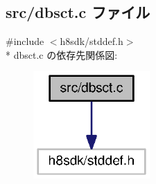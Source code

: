 \subsection{src/dbsct.c ファイル}
\label{dbsct_8c}
{\ttfamily \#include $<$h8sdk/stddef.\+h$>$}\\*
dbsct.\+c の依存先関係図\+:
\nopagebreak
\begin{figure}[H]
\begin{center}
\leavevmode
\includegraphics[width=126pt]{df/df0/dbsct_8c__incl}
\end{center}
\end{figure}
